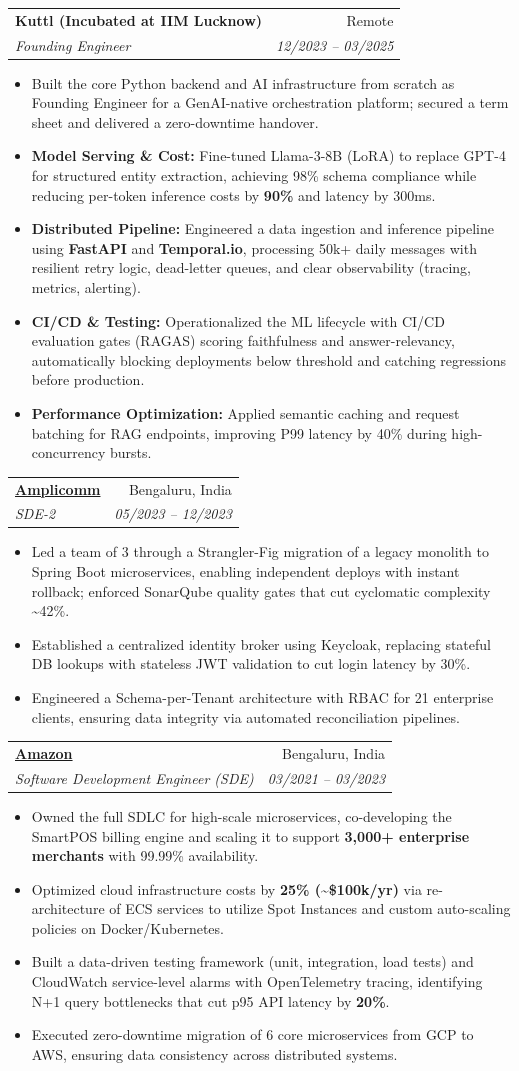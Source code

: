 \documentclass[11pt,a4paper]{article}
\makeatletter
\newcommand{\resumeItem}[1]{
  \item\small{
    {#1 \vspace{-2pt}}
  }
}
\newcommand{\resumeSubheading}[4]{
  \vspace{-1pt}\item
    \begin{tabular*}{0.97\textwidth}[t]{l@{\extracolsep{\fill}}r}
      \textbf{#1} & #2 \\
      \textit{\small#3} & \textit{\small #4} \\
    \end{tabular*}\vspace{-5pt}
}
\newcommand{\resumeItemListStart}{\begin{itemize}[itemsep=2pt, topsep=0pt, partopsep=0pt]}
\newcommand{\resumeItemListEnd}{\end{itemize}\vspace{-5pt}}
\makeatother
\begin{document}
    \resumeSubheading
      {Kuttl (Incubated at IIM Lucknow)}{Remote}
      {Founding Engineer}{12/2023 -- 03/2025}
      \resumeItemListStart
        \resumeItem{Built the core Python backend and AI infrastructure from scratch as Founding Engineer for a GenAI-native orchestration platform; secured a term sheet and delivered a zero-downtime handover.}
        \resumeItem{\textbf{Model Serving \& Cost:} Fine-tuned Llama-3-8B (LoRA) to replace GPT-4 for structured entity extraction, achieving 98\% schema compliance while reducing per-token inference costs by \textbf{90\%} and latency by 300ms.}
        \resumeItem{\textbf{Distributed Pipeline:} Engineered a data ingestion and inference pipeline using \textbf{FastAPI} and \textbf{Temporal.io}, processing 50k+ daily messages with resilient retry logic, dead-letter queues, and clear observability (tracing, metrics, alerting).}
        \resumeItem{\textbf{CI/CD \& Testing:} Operationalized the ML lifecycle with CI/CD evaluation gates (RAGAS) scoring faithfulness and answer-relevancy, automatically blocking deployments below threshold and catching regressions before production.}
        \resumeItem{\textbf{Performance Optimization:} Applied semantic caching and request batching for RAG endpoints, improving P99 latency by 40\% during high-concurrency bursts.}
      \resumeItemListEnd

    \resumeSubheading
      {\href{https://amplicomm.com/}{Amplicomm}}{Bengaluru, India}
      {SDE-2}{05/2023 -- 12/2023}
      \resumeItemListStart
        \resumeItem{Led a team of 3 through a Strangler-Fig migration of a legacy monolith to Spring Boot microservices, enabling independent deploys with instant rollback; enforced SonarQube quality gates that cut cyclomatic complexity \textasciitilde{}42\%.}
        \resumeItem{Established a centralized identity broker using Keycloak, replacing stateful DB lookups with stateless JWT validation to cut login latency by 30\%.}
        \resumeItem{Engineered a Schema-per-Tenant architecture with RBAC for 21 enterprise clients, ensuring data integrity via automated reconciliation pipelines.}
      \resumeItemListEnd

    \resumeSubheading
      {\href{https://www.amazon.in/}{Amazon}}{Bengaluru, India}
      {Software Development Engineer (SDE)}{03/2021 -- 03/2023}
      \resumeItemListStart
        \resumeItem{Owned the full SDLC for high-scale microservices, co-developing the SmartPOS billing engine and scaling it to support \textbf{3,000+ enterprise merchants} with 99.99\% availability.}
        \resumeItem{Optimized cloud infrastructure costs by \textbf{25\% (\textasciitilde{}\$100k/yr)} via re-architecture of ECS services to utilize Spot Instances and custom auto-scaling policies on Docker/Kubernetes.}
        \resumeItem{Built a data-driven testing framework (unit, integration, load tests) and CloudWatch service-level alarms with OpenTelemetry tracing, identifying N+1 query bottlenecks that cut p95 API latency by \textbf{20\%}.}
        \resumeItem{Executed zero-downtime migration of 6 core microservices from GCP to AWS, ensuring data consistency across distributed systems.}
      \resumeItemListEnd
\end{document}
